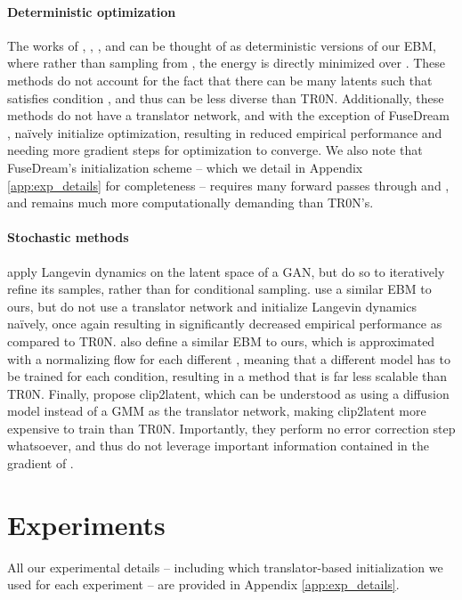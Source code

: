 \documentclass[nohyperref]{article}
\theoremstyle{plain}
\theoremstyle{definition}
\theoremstyle{remark}
\begin{document}
\paragraph{Deterministic optimization} The works of \citet{nguyen2016synthesizing}, \citet{liu2021fusedream}, \citet{patashnik2021styleclip}, and \citet{li2022composing} can be thought of as deterministic versions of our EBM, where rather than sampling from , the energy  is directly minimized over . These methods do not account for the fact that there can be many latents  such that  satisfies condition , and thus can be less diverse than TR0N. Additionally, these methods do not have a translator network, and with the exception of FuseDream \citep{liu2021fusedream}, na\"ively initialize optimization, resulting in reduced empirical performance and needing more gradient steps for optimization to converge. We also note that FuseDream's initialization scheme -- which we detail in Appendix \ref{app:exp_details} for completeness -- requires many forward passes through  and , and remains much more computationally demanding than TR0N's.

\paragraph{Stochastic methods} \citet{ansari2021refining} apply Langevin dynamics on the latent space of a GAN, but do so to iteratively refine its samples, rather than for conditional sampling. \citet{nguyen2017plug} use a similar EBM to ours, but do not use a translator network and initialize Langevin dynamics na\"{i}vely, once again resulting in significantly decreased empirical performance as compared to TR0N. \citet{promptgen2022} also define a similar EBM to ours, which is approximated with a normalizing flow for each different , meaning that a different model has to be trained for each condition, resulting in a method that is far less scalable than TR0N. Finally, \citet{Pinkney2022clip2latent} propose clip2latent, which can be understood as using a diffusion model instead of a GMM as the translator network, making clip2latent more expensive to train than TR0N. Importantly, they perform no error correction step whatsoever, and thus do not leverage important information contained in the gradient of .
 
\section{Experiments}
All our experimental details -- including which translator-based initialization we used for each experiment -- are provided in Appendix \ref{app:exp_details}.
\end{document}

